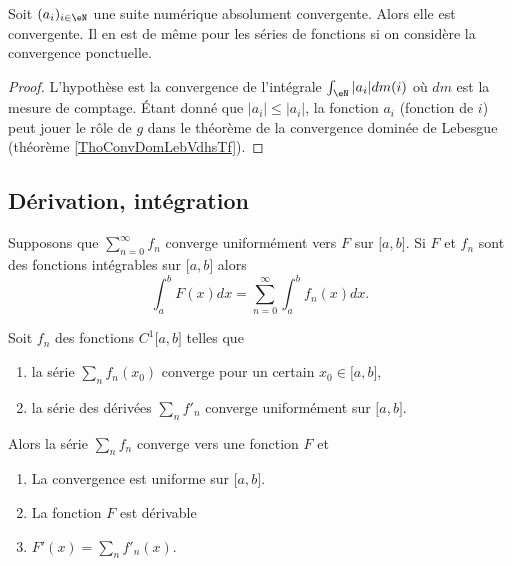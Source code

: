 \begin{corollary}       \label{CorCvAbsNormwEZdRc}
    Soit \( (a_i)_{i\in \eN}\) une suite numérique absolument convergente. Alors elle est convergente. Il en est de même pour les séries de fonctions si on considère la convergence ponctuelle.
\end{corollary}

\begin{proof}
    L'hypothèse est la convergence de l'intégrale \( \int_{\eN}| a_i |dm(i)\) où \( dm\) est la mesure de comptage. Étant donné que \( | a_i |\leq | a_i |\), la fonction \( a_i\) (fonction de \( i\)) peut jouer le rôle de \( g\) dans le théorème de la convergence dominée de Lebesgue (théorème \ref{ThoConvDomLebVdhsTf}).
\end{proof}

\subsection{Dérivation, intégration}

\begin{theorem}      \label{ThoCciOlZ}
    Supposons que \( \sum_{n=0}^{\infty}f_n\) converge uniformément vers \( F\) sur \( \mathopen[ a , b \mathclose]\). Si \( F\) et \( f_n\) sont des fonctions intégrables sur \( \mathopen[ a , b \mathclose]\) alors
    \begin{equation}
        \int_a^bF(x)dx=\sum_{n=0}^{\infty}\int_a^bf_n(x)dx.
    \end{equation}
\end{theorem}

\begin{theorem} \label{ThoCSGaPY}
    Soit \( f_n\) des fonctions \( C^1\mathopen[ a , b \mathclose]\) telles que
    \begin{enumerate}
        \item
            la série \( \sum_n f_n(x_0)\) converge pour un certain \( x_0\in\mathopen[ a , b \mathclose]\),
        \item
            la série des dérivées \( \sum_n f'_n\) converge uniformément sur \( \mathopen[ a , b \mathclose]\).
    \end{enumerate}
    Alors la série \( \sum_n f_n\) converge vers une fonction \( F\) et
    \begin{enumerate}
        \item
            La convergence est uniforme sur \( \mathopen[ a , b \mathclose]\).
        \item
            La fonction \( F\) est dérivable
        \item
            \( F'(x)=\sum_nf'_n(x)\).
    \end{enumerate}
\end{theorem}

